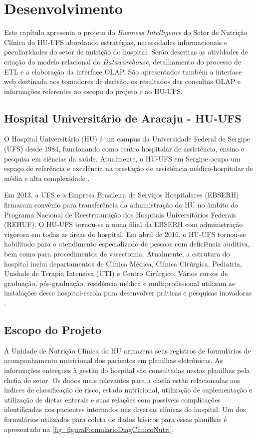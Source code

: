 \chapter{Desenvolvimento}
Este capítulo apresenta o projeto do \textit{Business Intelligence} do Setor de Nutrição Clínica do HU-UFS abordando estratégias, necessidades informacionais e peculiaridades do setor de nutrição do hospital. Serão descritas as atividades de criação do modelo relacional do \textit{Datawarehouse}, detalhamento do processo de ETL e a elaboração da interface OLAP. São apresentados também a interface web destinada aos tomadores de decisão, os resultados das consultas OLAP e informações referentes ao escopo do projeto e ao HU-UFS.
\section{Hospital Universitário de Aracaju - HU-UFS}
O Hospital Universitário (HU) é um campus da Universidade Federal de Sergipe (UFS) desde 1984, funcionando como centro hospitalar de assistência, ensino e pesquisa em ciências da saúde. Atualmente, o HU-UFS em Sergipe ocupa um espaço de referência e excelência na prestação de assistência médico-hospitalar de média e alta complexidade \cite{sitehuufs}.

Em 2013, a UFS e a Empresa Brasileira de Serviços Hospitalares (EBSERH) firmaram convênio para transferência da administração do HU no âmbito do Programa Nacional de Reestruturação dos Hospitais Universitários Federais (REHUF). O HU-UFS tornou-se a nona filial da EBSERH com administração vigorosa em todas as áreas do hospital. Em abril de 2016, o HU-UFS tornou-se habilitado para o atendimento especializado de pessoas com deficiência auditiva, bem como para procedimentos de vasectomia. Atualmente, a estrutura do hospital inclui departamentos de Clínica Médica, Clínica Cirúrgica, Pediatria, Unidade de Terapia Intensiva (UTI) e Centro Cirúrgico. Vários cursos de graduação, pós-graduação, residência médica e multiprofissional utilizam as instalações desse hospital-escola para desenvolver práticas e pesquisas inovadoras \cite{sitehuufs}. 

\section{Escopo do Projeto}
A Unidade de Nutrição Clínica do HU armazena seus registros de formulários de acompanhamento nutricional dos pacientes em planilhas eletrônicas. As informações entregues à gestão do hospital são consultadas nestas planilhas pela chefia do setor. Os dados mais relevantes para a chefia estão relacionadas aos índices de classificação de risco, estado nutricional, utilização de suplementação e utilização de dietas enterais e suas relações com possíveis complicações identificadas nos pacientes internados nas diversas clínicas do hospital. Um dos formulários utilizados para coleta de dados básicos para essas planilhas é apresentado na \autoref{fig_figuraFormularioDiagClinicoNutri}.

